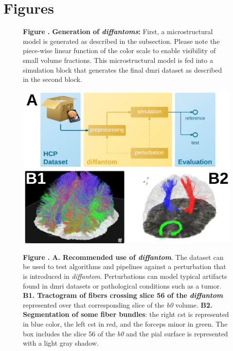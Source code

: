 \documentclass[english]{frontiers/frontiersSCNS} %
\begin{document}
\newpage
\section*{Figures}

\begin{figure}[h!]
\begin{center}

\end{center}
\textbf{\label{fig:figure1} Figure . }%
{\textbf{Generation of \emph{diffantoms}:} First, a microstructural model is generated as described
  in the  subsection.
Please note the piece-wise linear function of the color scale to enable visibility of small volume fractions.
This microstructural model is fed into a simulation block that generates the final \gls*{dmri} dataset
  as described in the second block.
}
\end{figure}

\begin{figure}[h!]
\begin{center}
\includegraphics[width=\linewidth]{figures/figure02}
\end{center}
\textbf{\label{fig:figure2} Figure . }%
{\textbf{A. Recommended use of \emph{diffantom}}.
The dataset can be used to test algorithms and pipelines against a perturbation that is
  introduced in \emph{diffantom}.
Perturbations can model typical artifacts found in \gls*{dmri} datasets or pathological conditions
  such as a tumor.
\textbf{B1. Tractogram of fibers crossing slice 56 of the \emph{diffantom}} represented over that corresponding
  slice of the \emph{b0} volume. \textbf{B2. Segmentation of some fiber bundles}: the right \gls*{cst} is
  represented in blue color, the left \gls*{cst} in red, and the forceps minor in green.
  The box includes the slice 56 of the \emph{b0} and the pial surface is represented with a light gray shadow.
}
\end{figure}
\end{document}
